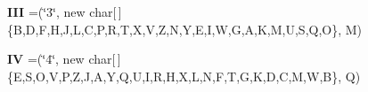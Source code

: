 \begin{DoxyCompactItemize}
\item 
\mbox{\label{enumde_1_1_enigma_1_1_util_1_1_enums_1_1_e_mill_alphabet_a572774577e69156f77f5e6cb98b72234}} 
{\bfseries I\+II} =(\char`\"{}3\char`\"{}, new char\mbox{[}$\,$\mbox{]} \{\textquotesingle{}B\textquotesingle{},\textquotesingle{}D\textquotesingle{},\textquotesingle{}F\textquotesingle{},\textquotesingle{}H\textquotesingle{},\textquotesingle{}J\textquotesingle{},\textquotesingle{}L\textquotesingle{},\textquotesingle{}C\textquotesingle{},\textquotesingle{}P\textquotesingle{},\textquotesingle{}R\textquotesingle{},\textquotesingle{}T\textquotesingle{},\textquotesingle{}X\textquotesingle{},\textquotesingle{}V\textquotesingle{},\textquotesingle{}Z\textquotesingle{},\textquotesingle{}N\textquotesingle{},\textquotesingle{}Y\textquotesingle{},\textquotesingle{}E\textquotesingle{},\textquotesingle{}I\textquotesingle{},\textquotesingle{}W\textquotesingle{},\textquotesingle{}G\textquotesingle{},\textquotesingle{}A\textquotesingle{},\textquotesingle{}K\textquotesingle{},\textquotesingle{}M\textquotesingle{},\textquotesingle{}U\textquotesingle{},\textquotesingle{}S\textquotesingle{},\textquotesingle{}Q\textquotesingle{},\textquotesingle{}O\textquotesingle{}\}, \textquotesingle{}M\textquotesingle{})
\item 
\mbox{\label{enumde_1_1_enigma_1_1_util_1_1_enums_1_1_e_mill_alphabet_aeca0f5a2e979e7845ac07915e3c00bd6}} 
{\bfseries IV} =(\char`\"{}4\char`\"{}, new char\mbox{[}$\,$\mbox{]} \{\textquotesingle{}E\textquotesingle{},\textquotesingle{}S\textquotesingle{},\textquotesingle{}O\textquotesingle{},\textquotesingle{}V\textquotesingle{},\textquotesingle{}P\textquotesingle{},\textquotesingle{}Z\textquotesingle{},\textquotesingle{}J\textquotesingle{},\textquotesingle{}A\textquotesingle{},\textquotesingle{}Y\textquotesingle{},\textquotesingle{}Q\textquotesingle{},\textquotesingle{}U\textquotesingle{},\textquotesingle{}I\textquotesingle{},\textquotesingle{}R\textquotesingle{},\textquotesingle{}H\textquotesingle{},\textquotesingle{}X\textquotesingle{},\textquotesingle{}L\textquotesingle{},\textquotesingle{}N\textquotesingle{},\textquotesingle{}F\textquotesingle{},\textquotesingle{}T\textquotesingle{},\textquotesingle{}G\textquotesingle{},\textquotesingle{}K\textquotesingle{},\textquotesingle{}D\textquotesingle{},\textquotesingle{}C\textquotesingle{},\textquotesingle{}M\textquotesingle{},\textquotesingle{}W\textquotesingle{},\textquotesingle{}B\textquotesingle{}\}, \textquotesingle{}Q\textquotesingle{})

\end{DoxyCompactItemize}
